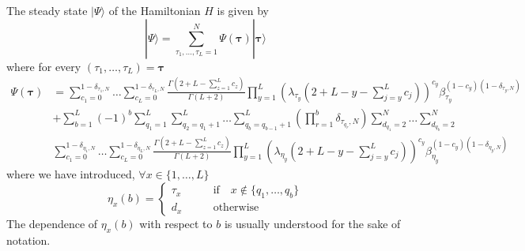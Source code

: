 \documentclass[10pt]{article}
\numberwithin{equation}{section}
\numberwithin{equation}{subsection}
\begin{document}
The steady state $|\Psi\rangle$ of the Hamiltonian $H$ is given by 
\begin{equation}\label{steadyStateH}
	|\Psi\rangle=\sum_{\tau_{1},\ldots,\tau_{L}=1}^{N}\Psi(\bm{\tau})|\bm{\tau}\rangle
\end{equation}
where for every $(\tau_{1},\ldots,\tau_{L})=\bm{\tau}$
\begin{equation}
	\begin{split}
		\Psi(\bm{\tau})&=\sum_{c_{1}=0}^{1-\delta_{\tau_{1},N}}\ldots\sum_{c_{L}=0}^{1-\delta_{\tau_{L},N}}\frac{\Gamma(2+L-\sum_{z=1}^{L}c_{z})}{\Gamma(L+2)}\prod_{y=1}^{L}\left(\lambda_{\tau_{y}}\left(2+L-y-\sum_{j=y}^{L}c_{j}\right)\right)^{c_{y}}\beta_{\tau_{y}}^{(1-c_{y})(1-\delta_{\tau_{y},N})}
		\\&+
		\sum_{b=1}^{L}(-1)^{b}\sum_{q_{1}=1}^{L}\sum_{q_{2}=q_{1}+1}^{L}\ldots\sum_{q_{b}=q_{b-1}+1}^{L}\left(\prod_{r=1}^{b}\delta_{\tau_{q_{r}},N}\right) 
		\sum_{d_{q_{1}}=2}^{N}\ldots\sum_{d_{q_{b}}=2}^{N}
		\\&
		\sum_{c_{1}=0}^{1-\delta_{\eta_{1},N}}\ldots\sum_{c_{L}=0}^{1-\delta_{\eta_{L},N}}\frac{\Gamma(2+L-\sum_{z=1}^{L}c_{z})}{\Gamma(L+2)}\prod_{y=1}^{L}\left(\lambda_{\eta_{y}}\left(2+L-y-\sum_{j=y}^{L}c_{j}\right)\right)^{c_{y}}\beta_{\eta_{y}}^{(1-c_{y})(1-\delta_{\eta_{y},N})}
	\end{split}
\end{equation}
where we have introduced, $\forall x\in \{1,\ldots,L\}$
\begin{equation}
	\eta_{x}(b)=\begin{cases}
		\tau_{x}\qquad &\text{if}\quad x\notin \{q_{1},\ldots,q_{b}\}\\
		d_{x}\qquad &\text{otherwise}
	\end{cases}%
	\end{equation}
	The dependence of $\eta_{x}(b)$ with respect to $b$ is usually understood for the sake of notation. 
\end{document}
